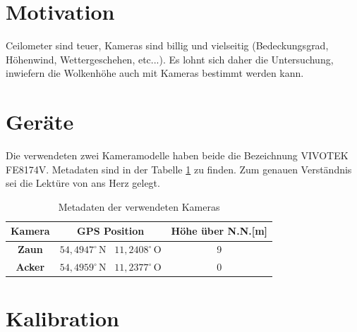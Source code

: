 \documentclass[a4paper,11pt,twoside,german]{article}
\newcommand{\absatz}{\smallbreak} %
\begin{document}
\listoffigures %

\newpage


\section{Motivation}

Ceilometer sind teuer, Kameras sind billig und vielseitig (Bedeckungsgrad,
Höhenwind, Wettergeschehen, etc...).  Es lohnt sich daher die Untersuchung,
inwiefern die Wolkenhöhe auch mit Kameras bestimmt werden kann.
\absatz
\blindtext[1]


\section{Geräte}

Die verwendeten zwei Kameramodelle haben beide die Bezeichnung VIVOTEK FE8174V.
Metadaten sind in der Tabelle \ref{TABKameraMeta} zu finden.
Zum genauen Verständnis sei die Lektüre von \cite{ingo} ans Herz gelegt.
\absatz

\begin{table}[!h]
\begin{center}
\caption{Metadaten der verwendeten Kameras}
\label{TABKameraMeta}
\absatz
\begin{tabular}{|c|c|c|}
\hline
\textbf{Kamera} & \textbf{GPS Position} & \textbf{Höhe über N.N.[m]} \\\hline
\textbf{Zaun}   & $54,4947^\circ\,\mathrm{N}$ \, $11,2408^\circ\,\mathrm{O}$ &
9                \\\hline
\textbf{Acker}   & $54,4959^\circ\,\mathrm{N}$ \, $11,2377^\circ\,\mathrm{O}$ &
0                \\\hline
\end{tabular}
\vspace{-0.5cm}
\end{center}
\end{table}

\blindtext


\section{Kalibration}
\end{document}

